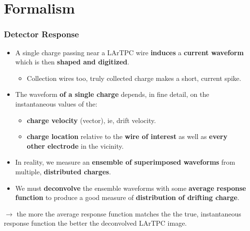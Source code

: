 \documentclass[xcolor=dvipsnames]{beamer}
\begin{document}



\section{Formalism}

\begin{frame}
  \frametitle{Detector Response}
  \begin{itemize}
  \item A single charge passing near a LArTPC wire \textbf{induces} a
    \textbf{current waveform} which is then \textbf{shaped and digitized}.
    \begin{itemize}\scriptsize
    \item Collection wires too, truly collected charge makes a short,
      current spike.
    \end{itemize}
  \item The waveform \textbf{of a single charge} depends, in fine
    detail, on the instantaneous values of the:
    \begin{itemize}\footnotesize
    \item \textbf{charge velocity} (vector), ie, drift velocity.
    \item \textbf{charge location} relative to the \textbf{wire of interest} as well
      as \textbf{every other electrode} in the vicinity.
    \end{itemize}
  \item In reality, we measure an \textbf{ensemble of superimposed
      waveforms} from multiple, \textbf{distributed charges}.
  \item We must \textbf{deconvolve} the ensemble waveforms
    with some \textbf{average response function} to produce a good
    measure of \textbf{distribution of drifting charge}.
  \end{itemize}
  
  \footnotesize
  $\rightarrow$ the more the average response function
  matches the the true, instantaneous response function the better
  the deconvolved LArTPC image.

\end{frame}
\end{document}

